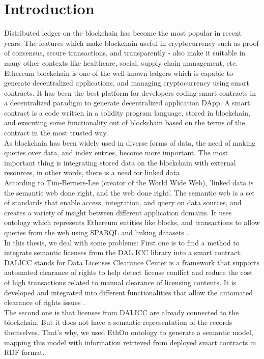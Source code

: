 \section{Introduction}
Distributed ledger on the blockchain has become the most popular in recent years. The features which make blockchain useful in cryptocurrency such as proof of consensus, secure transactions, and transparently - also make it suitable in many other contexts like healthcare, social, supply chain management, etc. \\
Ethereum blockchain is one of the well-known ledgers which is capable to generate decentralized applications, and managing cryptocurrency using smart contracts. It has been the best platform for developers coding smart contracts in a decentralized paradigm to generate decentralized application DApp.
A smart contract is a code written in a solidity program language, stored in blockchain, and executing some functionality out of blockchain based on the terms of the contract in the most trusted way. \\
As blockchain has been widely used in diverse forms of data, the need of making queries over data, and index entries, become more important. The most important thing is integrating stored data on the blockchain with external resources, in other words, there is a need for linked data \cite{Third}. \\
According to Tim-Berners-Lee (creator of the World Wide Web), 'linked data is the semantic web done right, and the web done right'\cite{Hector}. 
 The semantic web is a set of standards that enable access, integration, and query on data sources, and creates a variety of insight between different application domains. It uses ontology which represents Ethereum entities like blocks, and transactions to allow queries from the web using SPARQL and linking datasets \cite{Third}. \\
In this thesis, we deal with some problems: First one is to find a method to integrate semantic licenses from the DAL ICC library into a smart contract. 
DALICC stands for Data Licenses Clearance Center is a framework that supports automated clearance of rights to help detect license conflict and reduce the cost of high transactions related to manual clearance of licensing contents.
It is developed and integrated into different functionalities that allow the automated clearance of rights issues \cite{Anna}.\\
The second one is that licenses from DALICC are already connected to the blockchain, But it does not have a semantic representation of the records themselves. That's why, we used EthOn ontology to generate a semantic model, mapping this model with information retrieved from deployed smart contracts in RDF format. 
